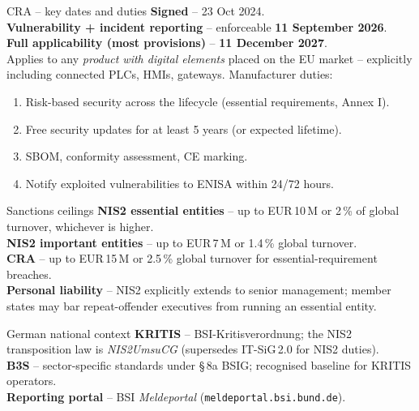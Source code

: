 \documentclass[10pt,a4paper,landscape]{article}
\begin{document}
\begin{minipage}[t]{0.49\linewidth}
\begin{panel}{CRA -- key dates and duties}
\small
\textbf{Signed} -- 23 Oct 2024.\\
\textbf{Vulnerability + incident reporting} -- enforceable \textbf{11 September 2026}.\\
\textbf{Full applicability (most provisions)} -- \textbf{11 December 2027}.\\[2pt]
Applies to any \emph{product with digital elements} placed on the EU market -- explicitly including connected PLCs, HMIs, gateways. Manufacturer duties:
\begin{enumerate}\setlength{\itemsep}{0pt}
  \item Risk-based security across the lifecycle (essential requirements, Annex I).
  \item Free security updates for at least 5 years (or expected lifetime).
  \item SBOM, conformity assessment, CE marking.
  \item Notify exploited vulnerabilities to ENISA within 24/72 hours.
\end{enumerate}
\end{panel}

\vspace{2mm}
\begin{panel}{Sanctions ceilings}
\small
\textbf{NIS2 essential entities} -- up to EUR\,10\,M or 2\,\% of global turnover, whichever is higher.\\
\textbf{NIS2 important entities} -- up to EUR\,7\,M or 1.4\,\% global turnover.\\
\textbf{CRA} -- up to EUR\,15\,M or 2.5\,\% global turnover for essential-requirement breaches.\\[2pt]
\textbf{Personal liability} -- NIS2 explicitly extends to senior management; member states may bar repeat-offender executives from running an essential entity.
\end{panel}

\vspace{2mm}
\begin{panel}{German national context}
\small
\textbf{KRITIS} -- BSI-Kritisverordnung; the NIS2 transposition law is \emph{NIS2UmsuCG} (supersedes IT-SiG\,2.0 for NIS2 duties).\\
\textbf{B3S} -- sector-specific standards under \S\,8a BSIG; recognised baseline for KRITIS operators.\\
\textbf{Reporting portal} -- BSI \emph{Meldeportal} (\texttt{meldeportal.bsi.bund.de}).
\end{panel}
\end{minipage}
\end{document}
